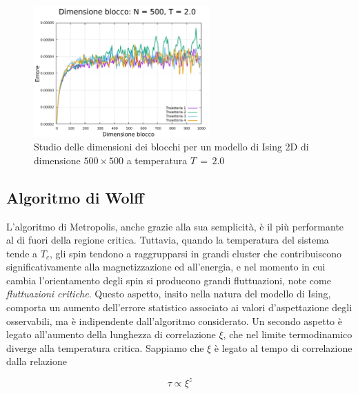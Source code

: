 \begin{figure}[H]
    \centering
    \includegraphics[width=0.6\textwidth]{Immagini/MC_meth/err_500_2.0.pdf}
    \caption{Studio delle dimensioni dei blocchi per un modello di Ising 2D di dimensione $500 \times 500$ a temperatura $T\,=\,2.0$}
    \label{fig: lblk_exe}
\end{figure}





\subsection{Algoritmo di Wolff}

L'algoritmo di Metropolis, anche grazie alla sua semplicità, è il più performante al di fuori della regione 
critica. Tuttavia, quando la temperatura del sistema tende a $T_c$, gli spin tendono a raggrupparsi in 
grandi cluster che contribuiscono significativamente alla magnetizzazione ed all'energia, e nel momento in 
cui cambia l'orientamento degli spin si producono grandi fluttuazioni, note come \textit{fluttuazioni critiche}. 
Questo aspetto, insito nella natura del modello di Ising, comporta un aumento dell'errore statistico 
associato ai valori d'aspettazione degli osservabili, ma è indipendente dall'algoritmo considerato. Un secondo aspetto è legato 
all'aumento della lunghezza di correlazione $\xi$, che nel limite termodinamico diverge alla temperatura critica. Sappiamo che $\xi$ 
è legato al tempo di correlazione dalla relazione 

\begin{equation}
    \tau \propto \xi^z
    \label{eq: tcorr_lcorr}
\end{equation}

